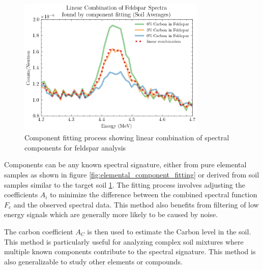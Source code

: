\begin{figure}[H]
\centering
\includegraphics[width=0.8\textwidth]{../Figures/Analysis/linear_combination_feldspar.png}
\caption{Component fitting process showing linear combination of spectral components for feldspar analysis}
\label{fig:component_fitting}
\end{figure}

Components can be any known spectral signature, either from pure elemental samples \cite{kavetskiy_neutron_2023} as shown in figure \ref{fig:elemental_component_fitting} or derived from soil samples similar to the target soil \ref{fig:component_fitting}. The fitting process involves adjusting the coefficients $A_i$ to minimize the difference between the combined spectral function $F_c$ and the observed spectral data. This method also benefits from filtering of low energy signals which are generally more likely to be caused by noise.

The carbon coefficient $A_C$ is then used to estimate the Carbon level in the soil. This method is particularly useful for analyzing complex soil mixtures where multiple known components contribute to the spectral signature. This method is also generalizable to study other elements or compounds.

